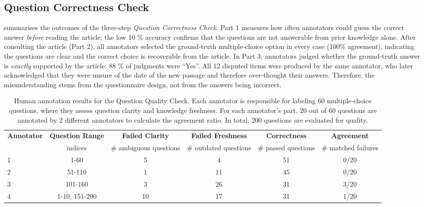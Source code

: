 \documentclass[11pt]{article}
\begin{document}
\subsection{Question Correctness Check}
 summarises the outcomes of the three‑step
\emph{Question Correctness Check}.
Part 1 measures how often annotators could guess the correct answer
\emph{before} reading the article; the low 10 \% accuracy confirms that the
questions are not answerable from prior knowledge alone.
After consulting the article (Part 2), all annotators selected the ground‑truth
multiple‑choice option in every case (100\% agreement), indicating the
questions are clear and the correct choice is recoverable from the article.
In Part 3, annotators judged whether the ground‑truth answer is \emph{exactly}
supported by the article; 88 \% of judgments were “Yes”.
All 12 disputed items were produced by the same annotator, who later acknowledged that they were unsure of the date of the new passage and therefore over‑thought their answers. Therefore, the misunderstanding stems from the questionnaire design, not from the answers being incorrect.

\begin{table*}[t]
    \centering
    \begin{tabular}{lccccc}
        \toprule
        \textbf{Annotator} &
        \textbf{Question Range} &
        \textbf{Failed Clarity} &
        \textbf{Failed Freshness} &
        \textbf{Correctness} &
        \textbf{Agreement} \\
        &\small indices & \small\# ambiguous questions &
        \small\# outdated questions &
        \small\# passed questions &
        \small\# matched failures \\
        \midrule
        1 & 1-60 & 5 & 4 & 51 & 0/20 \\
        2 & 51-110 & 1 & 11 & 45 & 0/20 \\
        3 & 101-160 & 3 & 26 & 31 & 3/20 \\
        4 & 1-10, 151-200 & 10 & 17 & 31 & 1/20 \\
        \bottomrule
    \end{tabular}
    \caption{Human annotation results for the Question Quality Check.
    Each annotator is responsible for labeling $60$ multiple-choice questions, where they assess question clarity and knowledge freshness. 
    For each annotator's part, $20$ out of $60$ questions are annotated by $2$ different annotators to calculate the agreement ratio.
    In total, $200$ questions are evaluated for quality.}
    \label{tab:qq_results}
\end{table*}
\end{document}
